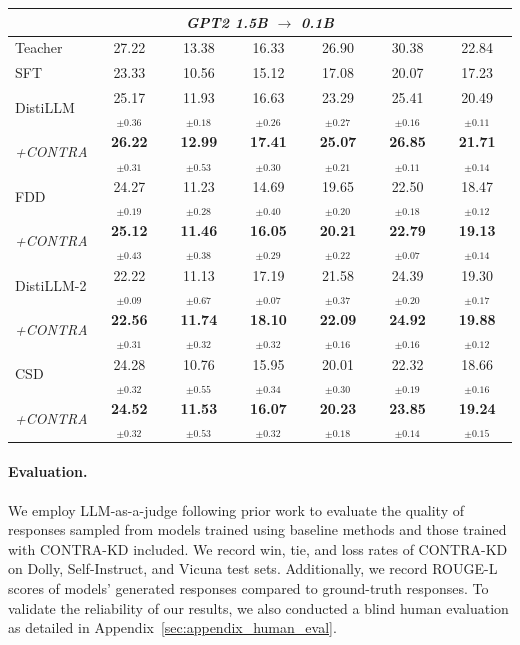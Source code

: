 \documentclass{article} %
\theoremstyle{definition}
\theoremstyle{remark}
\begin{document}
\begin{table}[t]
\begin{tabular}{lcccccc}
\multicolumn{7}{c}{\textit{GPT2 1.5B $\rightarrow$ 0.1B}} \\
\midrule
Teacher   & 27.22 & 13.38 & 16.33 & 26.90 & 30.38 & 22.84 \\
SFT       & 23.33 & 10.56 & 15.12 & 17.08 & 20.07 & 17.23 \\
\midrule
DistiLLM  & 25.17$_{\pm 0.36}$ & 11.93$_{\pm 0.18}$ & 16.63$_{\pm 0.26}$ & 23.29$_{\pm 0.27}$ & 25.41$_{\pm 0.16}$ & 20.49$_{\pm 0.11}$ \\
\textit{+CONTRA}
          & \textbf{26.22}$_{\pm 0.31}$ & \textbf{12.99}$_{\pm 0.53}$ & \textbf{17.41}$_{\pm 0.30}$ & \textbf{25.07}$_{\pm 0.21}$ & \textbf{26.85}$_{\pm 0.11}$ & \textbf{21.71}$_{\pm 0.14}$ \\
\midrule
FDD       & 24.27$_{\pm 0.19}$ & 11.23$_{\pm 0.28}$ & 14.69$_{\pm 0.40}$ & 19.65$_{\pm 0.20}$ & 22.50$_{\pm 0.18}$ & 18.47$_{\pm 0.12}$ \\
\textit{+CONTRA}
          & \textbf{25.12}$_{\pm 0.43}$ & \textbf{11.46}$_{\pm 0.38}$ & \textbf{16.05}$_{\pm 0.29}$ & \textbf{20.21}$_{\pm 0.22}$ & \textbf{22.79}$_{\pm 0.07}$ & \textbf{19.13}$_{\pm 0.14}$ \\
\midrule
DistiLLM-2 & 22.22$_{\pm 0.09}$ & 11.13$_{\pm 0.67}$ & 17.19$_{\pm 0.07}$ & 21.58$_{\pm 0.37}$ & 24.39$_{\pm 0.20}$ & 19.30$_{\pm 0.17}$ \\
\textit{+CONTRA}
          & \textbf{22.56}$_{\pm 0.31}$ & \textbf{11.74}$_{\pm 0.32}$ & \textbf{18.10}$_{\pm 0.32}$ & \textbf{22.09}$_{\pm 0.16}$ & \textbf{24.92}$_{\pm 0.16}$ & \textbf{19.88}$_{\pm 0.12}$ \\
\midrule
CSD       & 24.28$_{\pm 0.32}$ & 10.76$_{\pm 0.55}$ & 15.95$_{\pm 0.34}$ & 20.01$_{\pm 0.30}$ & 22.32$_{\pm 0.19}$ & 18.66$_{\pm 0.16}$ \\
\textit{+CONTRA}
          & \textbf{24.52}$_{\pm 0.32}$ & \textbf{11.53}$_{\pm 0.53}$ & \textbf{16.07}$_{\pm 0.32}$ & \textbf{20.23}$_{\pm 0.18}$ & \textbf{23.85}$_{\pm 0.14}$ & \textbf{19.24}$_{\pm 0.15}$ \\
\bottomrule
\end{tabular}
\end{table}

\paragraph{Evaluation.}
We employ LLM-as-a-judge following prior work \cite{zheng2023judgingllmasajudgemtbenchchatbot} to evaluate the quality of responses sampled from models trained using baseline methods and those trained with CONTRA-KD included. We record win, tie, and loss rates of CONTRA-KD on Dolly, Self-Instruct, and Vicuna test sets. Additionally, we record ROUGE-L \cite{lin-2004-rouge} scores of models' generated responses compared to ground-truth responses. To validate the reliability of our results, we also conducted a blind human evaluation as detailed in Appendix~\ref{sec:appendix_human_eval}.
\end{document}
